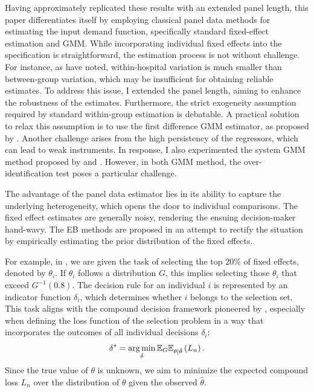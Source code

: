 \documentclass[12pt]{article}
\begin{document}
Having approximately replicated these results with an extended panel length,
this paper differentiates itself by employing classical panel data methods for
estimating the input demand function, specifically standard fixed-effect
estimation and GMM. While incorporating individual fixed effects into the
specification is straightforward, the estimation process is not without
challenge. For instance, as \citet{croiset2024hospitals} have noted,
within-hospital variation is much smaller than between-group variation, which
may be insufficient for obtaining reliable estimates. To address this issue, I
extended the panel length, aiming to enhance the robustness of the estimates.
Furthermore, the strict exogeneity assumption required by standard within-group
estimation is debatable. A practical solution to relax this assumption is to
use the first difference GMM estimator, as proposed by
\citet{arellano1991some}. Another challenge arises from the high persistency of
the regressors, which can lead to weak instruments. In response, I also
experimented the system GMM method proposed by \citet{arellano1995another} and
\citet{blundell1998initial}. However, in both GMM method, the
over-identification test poses a particular challenge.

The advantage of the panel data estimator lies in its ability to capture the
underlying heterogeneity, which opens the door to individual comparisons. The
fixed effect estimates are generally noisy, rendering the ensuing
decision-maker hand-wavy. The EB methods are proposed in an attempt to rectify
the situation by empirically estimating the prior distribution of the fixed
effects.

For example, in \cite{gu2023invidious}, we are given the task of selecting the
top 20\% of fixed effects, denoted by $\theta_i$. If $\theta_i$ follows a
distribution $G$, this implies selecting those $\theta_i$ that exceed
$G^{-1}(0.8)$. The decision rule for an individual $i$ is represented by an
indicator function $\delta_i$, which determines whether $i$ belongs to the
selection set. This task aligns with the compound decision framework pioneered
by \cite{herbert1956empirical}, especially when defining the loss function of
the selection problem in a way that incorporates the outcomes of all individual
decisions $\delta_i$:
\begin{equation*}
    \delta^* = \operatorname*{arg\,min}_{\delta} \mathbb{E}_G\mathbb{E}_{\theta|\hat{\theta}}\left(L_n\right).
\end{equation*}
Since the true value of $\theta$ is unknown, we aim to minimize the expected compound loss $L_n$ over the distribution of $\theta$ given the observed $\hat{\theta}$.
\end{document}
